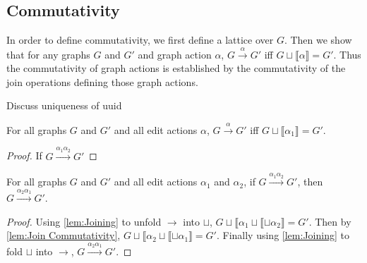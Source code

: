 

\subsection{Commutativity}%
\label{sub:Commutativity:formal}

In order to define commutativity, we first define a lattice over $G$.
Then we show that for any graphs $G$ and $G'$ and graph action $\alpha$,
$G \overset{\alpha}\rightarrow G'$
iff $G \sqcup \llbracket\alpha\rrbracket = G'$.
Thus the commutativity of graph actions is established
by the commutativity of the join operations defining those graph actions.

Discuss uniqueness of uuid

\begin{lemma}
  \label{lem:Join Commutativity}
\end{lemma}

\begin{lemma}[Joining]
  \label{lem:Joining}
  For all graphs $G$ and $G'$ and all edit actions $\alpha$,
  $G \overset{\alpha}{\longrightarrow} G'$
  iff $G \sqcup \llbracket\alpha_1\rrbracket = G'$.
\end{lemma}
\begin{proof}
  If $G \overset{\alpha_1\alpha_2}{\longrightarrow} G'$
\end{proof}


\begin{theorem}[Commutativity]
  \label{thm:Commutativity}
  For all graphs $G$ and $G'$ and all edit actions $\alpha_1$ and $\alpha_2$,
  if $G \overset{\alpha_1\alpha_2}{\longrightarrow} G'$,
  then $G \overset{\alpha_2\alpha_1}{\longrightarrow} G'$.
\end{theorem}
\begin{proof}
  Using \autoref{lem:Joining} to unfold $\rightarrow$ into $\sqcup$,
  $G \sqcup \llbracket\alpha_1 \sqcup \llbracket \sqcup \alpha_2 \rrbracket = G'$.
  Then by \autoref{lem:Join Commutativity},
  $G \sqcup \llbracket\alpha_2 \sqcup \llbracket \sqcup \alpha_1 \rrbracket = G'$.
  Finally using \autoref{lem:Joining} to fold $\sqcup$ into $\rightarrow$,
  $G \overset{\alpha_2\alpha_1}{\longrightarrow} G'$.
\end{proof}

